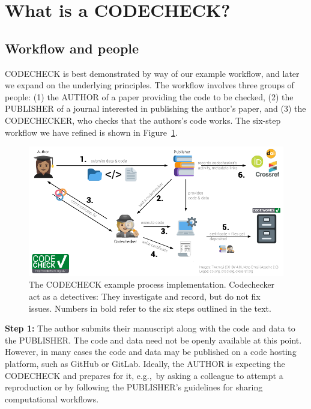 \documentclass[12pt]{article}
\begin{document}
\section*{What is a CODECHECK?}\label{what-is-a-codecheck}

\subsection*{Workflow and people}\label{workflow-people}

CODECHECK is best demonstrated by way of our example workflow, and later
we expand on the underlying principles. The workflow involves three
groups of people:
(1) the AUTHOR of a paper providing the code to be checked,
(2) the PUBLISHER of a journal interested in publishing the author's paper, and
(3) the CODECHECKER, who checks that the authors's code works.
The six-step workflow we have refined is shown in Figure~\ref{fig:workflow}.

\begin{figure}
  \centering
      \includegraphics[width=\textwidth]{figs/codecheck_overview.pdf}
      \caption{The CODECHECK example process implementation.
        Codechecker act as a detectives: They investigate and record,
        but do not fix issues.  Numbers in bold refer to the six steps
        outlined in the text.}
  \label{fig:workflow}
\end{figure}

\textbf{Step 1:} The author submits their manuscript along with the code and data to the PUBLISHER.
The code and data need not be openly available at this point.
However, in many cases the code and data may be published on a code hosting platform,
such as GitHub or GitLab. Ideally, the AUTHOR is expecting the CODECHECK and
prepares for it, e.g.,~by asking a colleague to attempt a reproduction or by 
following the PUBLISHER's guidelines for sharing computational workflows.
\end{document}
